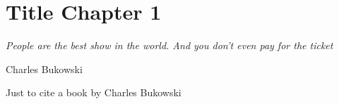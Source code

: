 \chapter{Title Chapter 1}
\label{ch:chapter1}

\epigraph{\emph{People are the best show in the world. And you don't even pay for the ticket}}{Charles Bukowski}

Just to cite a book by Charles Bukowski~\cite{bukowski2008tales}
